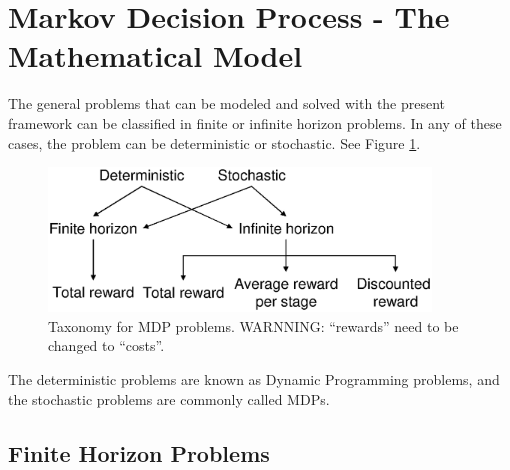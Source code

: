 \documentclass[11pt]{article}
\begin{document}
\section{Markov Decision Process - The Mathematical Model}

The general problems that can be modeled and solved with the present framework can be classified in finite or infinite horizon problems. In any of these cases, the problem can be deterministic or stochastic. See Figure \ref{fig:classification}.

\begin{figure}[htb]  \centering
   \includegraphics[width=4in]{taxonomy3}
    \caption{Taxonomy for MDP problems. WARNNING: ``rewards'' need to be changed to ``costs''.}
   \label{fig:classification}
\end{figure}

The deterministic problems are known as Dynamic Programming  problems, and the stochastic problems are commonly called MDPs.

\subsection{Finite Horizon Problems}
\end{document}
